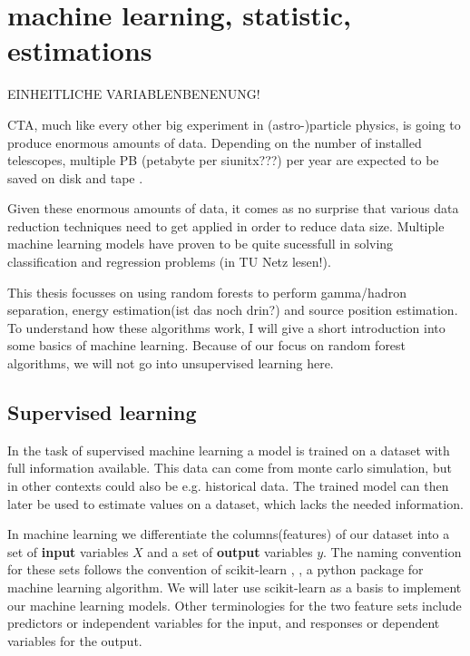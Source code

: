 \chapter{machine learning, statistic, estimations}\label{ml}

EINHEITLICHE VARIABLENBENENUNG!

CTA, much like every other big experiment in (astro-)particle physics,
is going to produce enormous amounts of data.
Depending on the number of installed telescopes, multiple
PB (petabyte per siunitx???) per year are expected to be saved 
on disk and tape \cite{lamanna2015cherenkov}.

Given these enormous amounts of data, it comes as no surprise that
various data reduction techniques need to get applied in 
order to reduce data size.
Multiple machine learning models have proven to be
quite sucessfull in solving classification and
regression problems 
\cite{doi:10.1142/S0218271810017160}
(in TU Netz lesen!).

This thesis focusses on using random forests to
perform gamma/hadron separation, energy estimation(ist das noch drin?)
and source position estimation.
To understand how these algorithms work, I will
give a short introduction into some basics of machine learning.
Because of our focus on random forest algorithms, we will not 
go into unsupervised learning here.

\section{Supervised learning}
In the task of supervised machine learning a model is trained on a
dataset with full information available.
This data can come from monte carlo simulation, but in other contexts 
could also be e.g. historical data.
The trained model can then later be used to estimate values on a dataset, which
lacks the needed information. 

In machine learning we differentiate
the columns(features) of our dataset into a set of \textbf{input} variables $X$ and
a set of \textbf{output} variables $y$. The naming convention for
these sets follows the convention of scikit-learn
\cite{scikit-learn}, \cite{sklearn_api}, a python package for
machine learning algorithm.
We will later use scikit-learn as a basis to implement our machine learning models.
Other terminologies for the two feature sets include
predictors or independent variables for the input, and
responses or dependent variables for the output.

